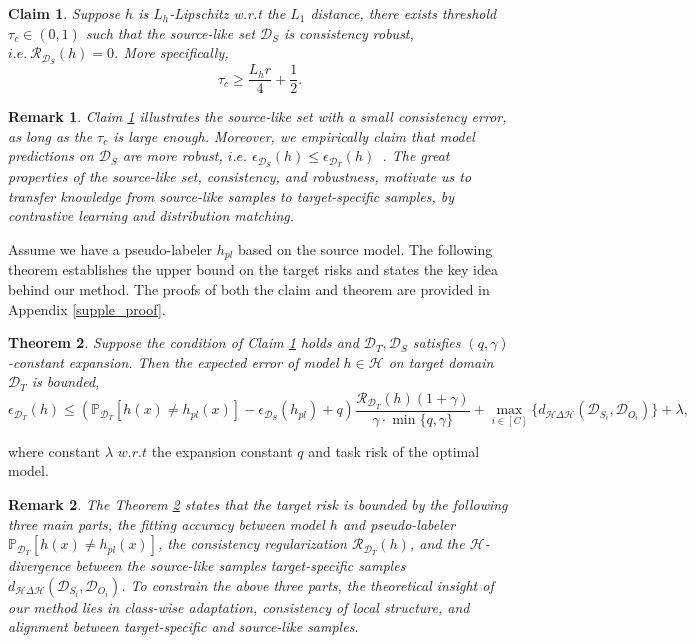 \documentclass{article}
\newtheorem{theorem}{Theorem}[section]
\newtheorem{remark}{Remark}
\newtheorem{claim}[theorem]{Claim}
\begin{document}
\begin{claim}\label{thm:src} Suppose $h$ is $L_h$-Lipschitz w.r.t the $L_1$ distance, there exists threshold $\tau_c \in (0,1)$ such that the source-like set $\mathcal{D}_S$ is consistency robust, $i.e. \ \mathcal{R}_{\mathcal{D}_S}(h) = 0$. More specifically, 
\begin{equation*}
    \tau_c \geq \frac{L_h r}{4}+ \frac{1}{2}.
\end{equation*}
\end{claim}

\begin{remark}
Claim \ref{thm:src} illustrates the source-like set with a small consistency error, as long as the $\tau_c$ is large enough. Moreover, we empirically claim that model predictions on $\mathcal{D}_S$ are more robust, $i.e.$ $\epsilon_{\mathcal{D}_S}(h)\leq \epsilon_{\mathcal{D}_T}(h)$~\cite{kim2020PrDA}. The great properties of the source-like set, consistency, and robustness, motivate us to transfer knowledge from source-like samples to target-specific samples, by contrastive learning and distribution matching.
\end{remark}
Assume we have a pseudo-labeler $h_{pl}$ based on the source model. The following theorem establishes the upper bound on the target risks and states the key idea behind our method. The proofs of both the claim and theorem are provided in Appendix \ref{supple_proof}. 

\begin{theorem}\label{thm:main} Suppose the condition of Claim \ref{thm:src} holds and $\mathcal{D}_T,\mathcal{D}_S$ satisfies $(q,\gamma)$-constant expansion. Then the expected error of model $h\in \mathcal{H}$ on target domain $\mathcal{D}_T$ is bounded,
$$\epsilon_{\mathcal{D}_T}(h) \leq  
\left(
  \mathbb{P}_{\mathcal{D}_T}[h(x) \neq h_{pl}(x)] 
 - \epsilon_{\mathcal{D}_S}(h_{pl}) + q
\right)
\frac{\mathcal{R}_{\mathcal{D}_T}(h)(1+\gamma)}{\gamma \cdot \min{\{q,\gamma\}}} + \max_{i \in [C]}\{d_{\mathcal{H}\Delta\mathcal{H}}(\mathcal{D}_{S_i},\mathcal{D}_{O_i})\}+\lambda,$$ 
\end{theorem}
where constant $\lambda$ $w.r.t$ the expansion constant $q$ and task risk of the optimal model. 

\begin{remark}
The Theorem \ref{thm:main} states that the target risk is bounded by the following three main parts, the fitting accuracy between model $h$ and pseudo-labeler $ \mathbb{P}_{\mathcal{D}_T}[h(x) \neq h_{pl}(x)]$, the consistency regularization $\mathcal{R}_{\mathcal{D}_T}(h)$, and the $\mathcal{H}$-divergence between the source-like samples target-specific samples $d_{\mathcal{H}\Delta\mathcal{H}}(\mathcal{D}_{S_i},\mathcal{D}_{O_i})$. To constrain the above three parts, the theoretical insight of our method lies in class-wise adaptation, consistency of local structure, and alignment between target-specific and source-like samples. 
\end{remark}
\end{document}
